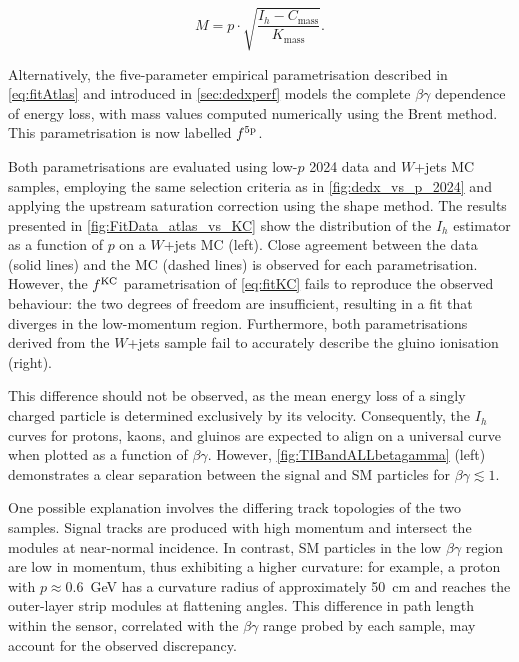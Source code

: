 \begin{equation}
    M = p \cdot \sqrt{ \frac{I_h - C_\textrm{mass}}{K_\textrm{mass}} }.
    \label{eq:massHSCPanalysis}
\end{equation}

Alternatively, the five-parameter empirical parametrisation described in \cref{eq:fitAtlas} and introduced in \cref{sec:dedxperf} models the complete $\beta\gamma$ dependence of energy loss, with mass values computed numerically using the Brent method. This parametrisation is now labelled $f^{\rm 5p}$.

Both parametrisations are evaluated using low-$p$ 2024 data and $W$+jets MC samples, employing the same selection criteria as in \cref{fig:dedx_vs_p_2024} and applying the upstream saturation correction using the shape method. The results presented in \cref{fig:FitData_atlas_vs_KC} show the distribution of the $I_h$ estimator as a function of $p$ on a $W$+jets MC (left). Close agreement between the data (solid lines) and the MC (dashed lines) is observed for each parametrisation. However, the $f^{\rm KC}$ parametrisation of \cref{eq:fitKC} fails to reproduce the observed behaviour: the two degrees of freedom are insufficient, resulting in a fit that diverges in the low-momentum region. Furthermore, both parametrisations derived from the $W$+jets sample fail to accurately describe the gluino ionisation (right).

\vspace{0.5 cm}

This difference should not be observed, as the mean energy loss of a singly charged particle is determined exclusively by its velocity. Consequently, the $I_h$ curves for protons, kaons, and gluinos are expected to align on a universal curve when plotted as a function of $\beta\gamma$. However, \cref{fig:TIBandALLbetagamma} (left) demonstrates a clear separation between the signal and SM particles for $\beta\gamma \lesssim 1$.

One possible explanation involves the differing track topologies of the two samples. Signal tracks are produced with high momentum and intersect the modules at near-normal incidence. In contrast, SM particles in the low $\beta\gamma$ region are low in momentum, thus exhibiting a higher curvature: for example, a proton with $p \approx 0.6$~GeV has a curvature radius of approximately 50~cm and reaches the outer-layer strip modules at flattening angles. This difference in path length within the sensor, correlated with the $\beta\gamma$ range probed by each sample, may account for the observed discrepancy.

